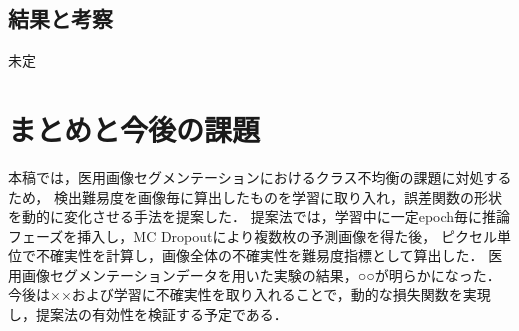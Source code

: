 \documentclass[10pt, a4paper, twocolumn]{jarticle}
\begin{document}
\subsection{結果と考察}
未定

\section{まとめと今後の課題}
本稿では，医用画像セグメンテーションにおけるクラス不均衡の課題に対処するため，
検出難易度を画像毎に算出したものを学習に取り入れ，誤差関数の形状を動的に変化させる手法を提案した．
提案法では，学習中に一定epoch毎に推論フェーズを挿入し，MC Dropoutにより複数枚の予測画像を得た後，
ピクセル単位で不確実性を計算し，画像全体の不確実性を難易度指標として算出した．
医用画像セグメンテーションデータを用いた実験の結果，○○が明らかになった．
今後は××および学習に不確実性を取り入れることで，動的な損失関数を実現し，提案法の有効性を検証する予定である．


    
\end{document}
